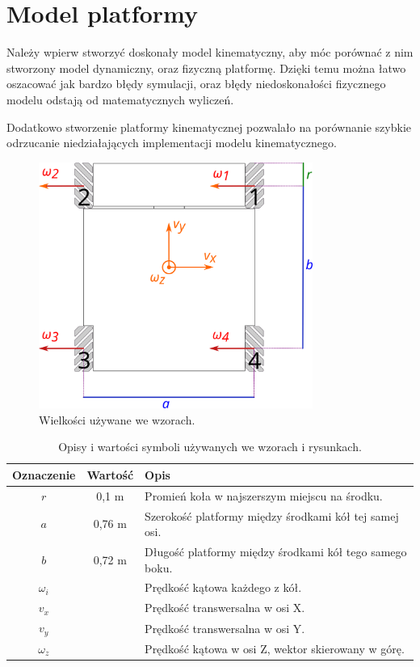 \chapter{Model platformy}
Należy wpierw stworzyć doskonały model kinematyczny, aby móc porównać z nim stworzony model dynamiczny, oraz fizyczną platformę.
Dzięki temu można łatwo oszacować jak bardzo błędy symulacji, oraz błędy niedoskonałości fizycznego modelu odstają od matematycznych wyliczeń.

Dodatkowo stworzenie platformy kinematycznej pozwalało na porównanie szybkie odrzucanie niedziałających implementacji modelu kinematycznego.
\begin{figure}[H]
\centering
 \includegraphics[width=0.8\textwidth]{graphics/base_dims.pdf}
\caption{Wielkości używane we wzorach.}
\label{fig:base_dims}
\end{figure} 

\begin{table}
\centering
\begin{tabular}{c c l}
Oznaczenie & Wartość & Opis \\
\hline
$r$ & 0,1 m & Promień koła w najszerszym miejscu na środku. \\
$a$ & 0,76 m & Szerokość platformy między środkami kół tej samej osi. \\
$b$ & 0,72 m & Długość platformy między środkami kół tego samego boku. \\
$\omega_i$ & & Prędkość kątowa każdego z kół. \\
$v_x$ & & Prędkość transwersalna w osi X. \\
$v_y$ & & Prędkość transwersalna w osi Y. \\
$\omega_z$ & & Prędkość kątowa w osi Z, wektor skierowany w górę. \\
\end{tabular}
\caption{Opisy i wartości symboli używanych we wzorach i rysunkach.}
\label{tab:dims}
\end{table}

